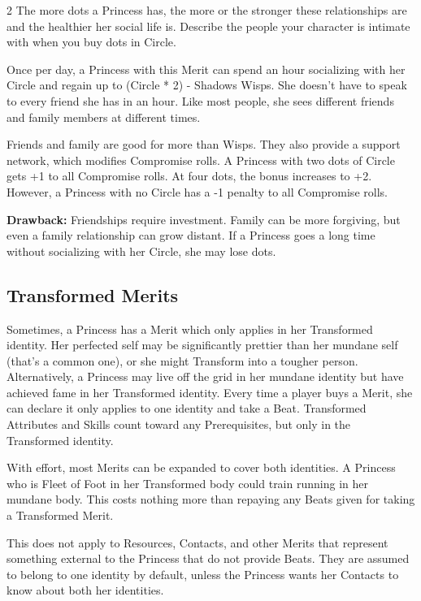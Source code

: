 \begin{multicols}{2}
The more dots a Princess has, the more or the stronger these relationships are and the healthier her social life is. Describe the people your character is intimate with when you buy dots in Circle.

Once per day, a Princess with this Merit can spend an hour socializing with her Circle and regain up to (Circle * 2) - Shadows Wisps. She doesn’t have to speak to every friend she has in an hour. Like most people, she sees different friends and family members at different times. 

Friends and family are good for more than Wisps. They also provide a support network, which modifies Compromise rolls. A Princess with two dots of Circle gets +1 to all Compromise rolls. At four dots, the bonus increases to +2. However, a Princess with no Circle has a -1 penalty to all Compromise rolls.

\textbf{Drawback:} Friendships require investment. Family can be more forgiving, but even a family relationship can grow distant. If a Princess goes a long time without socializing with her Circle, she may lose dots. 

\begin{mybox}     

\subsection*{Transformed Merits}

Sometimes, a Princess has a Merit which only applies in her Transformed identity. Her perfected self may be significantly prettier than her mundane self (that's a common one), or she might Transform into a tougher person. Alternatively, a Princess may live off the grid in her mundane identity but have achieved fame in her Transformed identity. Every time a player buys a Merit, she can declare it only applies to one identity and take a Beat. Transformed Attributes and Skills count toward any Prerequisites, but only in the Transformed identity. 

With effort, most Merits can be expanded to cover both identities. A Princess who is Fleet of Foot in her Transformed body could train running in her mundane body. This costs nothing more than repaying any Beats given for taking a Transformed Merit. 

This does not apply to Resources, Contacts, and other Merits that represent something external to the Princess that do not provide Beats. They are assumed to belong to one identity by default, unless the Princess wants her Contacts to know about both her identities.


\end{mybox}
\end{multicols}
